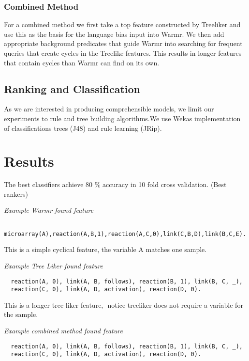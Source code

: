\documentclass[runningheads,a4paper]{llncs}
\begin{document}
\subsubsection{Combined Method}
For a combined method we first take a top feature constructed by Treeliker and use this as the basis for the language bias input into Warmr. We then add appropriate background predicates that guide Warmr into searching for frequent queries that create cycles in the Treelike features. This results in longer features that contain cycles than Warmr can find on its own. 
	     
\subsection{Ranking and Classification}
As we are interested in producing comprehensible models, we limit our experiments to rule and tree building algorithms.We use Wekas implementation of classifications trees (J48) and rule learning (JRip). 
	     
\section{Results}
The best classifiers achieve 80 \% accuracy in 10 fold cross validation.
(Best rankers)
\newline

\noindent
{\it{Example Warmr found feature}}

\begin{verbatim}
  microarray(A),reaction(A,B,1),reaction(A,C,0),link(C,B,D),link(B,C,E).
\end{verbatim}
\noindent 
This is a simple cyclical feature, the variable A matches one sample. 
\newline

\noindent
{\it{Example Tree Liker found feature}}

\begin{verbatim}
  reaction(A, 0), link(A, B, follows), reaction(B, 1), link(B, C, _),    
  reaction(C, 0), link(A, D, activation), reaction(D, 0).
\end{verbatim}
\noindent 
This is a longer tree liker feature, -notice treeliker does not require a variable for the sample.  
\newline

\noindent
{\it{Example combined method found feature}}

\begin{verbatim}
  reaction(A, 0), link(A, B, follows), reaction(B, 1), link(B, C, _),    
  reaction(C, 0), link(A, D, activation), reaction(D, 0).
\end{verbatim}
\end{document}
